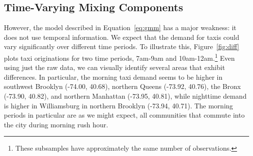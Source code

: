 \documentclass[12pt]{article}
\theoremstyle{definition}
\theoremstyle{algodesc}
\begin{document}
\subsection{Time-Varying Mixing Components} \label{sec:gmm_cat}
However, the model described in Equation~\ref{eq:gmm} has a major weakness: it does not use temporal information. We expect that the demand for taxis could vary significantly over different time periods. To illustrate this, Figure~\ref{fig:diff} plots taxi originations for two time periods, 7am-9am and 10am-12am.\footnote{These subsamples have approximately the same number of observations.} Even using just the raw data, we can visually identify several areas that exhibit differences. In particular, the morning taxi demand seems to be higher in southwest Brooklyn (-74.00, 40.68), northern Queens (-73.92, 40.76), the Bronx (-73.90, 40.82), and northern Manhattan (-73.95, 40.81), while nighttime demand is higher in Williamsburg in northern Brooklyn (-73.94, 40.71). The morning periods in particular are as we might expect, all communities that commute into the city during morning rush hour.
\end{document}
